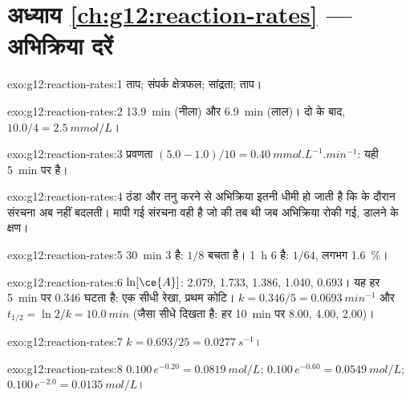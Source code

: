 \section*{अध्याय \ref{ch:g12:reaction-rates} --- अभिक्रिया दरें}

\begin{solution}{exo:g12:reaction-rates:1}
ताप; संपर्क क्षेत्रफल; सांद्रता; ताप।
\end{solution}

\begin{solution}{exo:g12:reaction-rates:2}
\qty{13.9}{min} (नीला) और \qty{6.9}{min} (लाल)। दो  के बाद,
$10.0 / 4 = \qty{2.5}{mmol/L}$।
\end{solution}

\begin{solution}{exo:g12:reaction-rates:3}
प्रवणता $(5.0 - 1.0)/10 = \qty{0.40}{mmol.L^{-1}.min^{-1}}$: यही
\qty{5}{min} पर  है।
\end{solution}

\begin{solution}{exo:g12:reaction-rates:4}
ठंडा और तनु करने से अभिक्रिया इतनी धीमी हो जाती है कि  के दौरान संरचना
अब नहीं बदलती। मापी गई संरचना वही है जो
 की तब थी जब अभिक्रिया रोकी गई, डालने के क्षण।
\end{solution}

\begin{solution}{exo:g12:reaction-rates:5}
\qty{30}{min} 3  है: $1/8$ बचता है। \qty{1}{h} 6  है:
$1/64$, लगभग \qty{1.6}{\percent}।
\end{solution}

\begin{solution}{exo:g12:reaction-rates:6}
$\ln[\ce{A}]$: 2.079, 1.733, 1.386, 1.040, 0.693। यह हर \qty{5}{min} पर
0.346 घटता है: एक सीधी रेखा, प्रथम कोटि। $k = 0.346/5 =
\qty{0.0693}{min^{-1}}$ और $t_{1/2} = \ln 2 / k = \qty{10.0}{min}$ (जैसा
सीधे दिखता है: हर \qty{10}{min} पर 8.00, 4.00, 2.00)।
\end{solution}

\begin{solution}{exo:g12:reaction-rates:7}
$k = 0.693 / 25 = \qty{0.0277}{s^{-1}}$।
\end{solution}

\begin{solution}{exo:g12:reaction-rates:8}
$0.100\,e^{-0.20} = \qty{0.0819}{mol/L}$; $0.100\,e^{-0.60} =
\qty{0.0549}{mol/L}$; $0.100\,e^{-2.0} = \qty{0.0135}{mol/L}$।
\end{solution}

